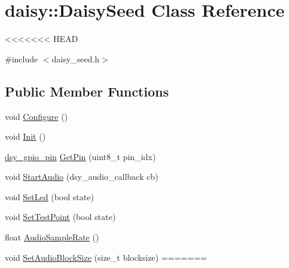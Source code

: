 \hypertarget{classdaisy_1_1_daisy_seed}{}\section{daisy\+:\+:Daisy\+Seed Class Reference}
\label{classdaisy_1_1_daisy_seed}
<<<<<<< HEAD


{\ttfamily \#include $<$daisy\+\_\+seed.\+h$>$}

\subsection*{Public Member Functions}
\begin{DoxyCompactItemize}
\item 
void \hyperlink{classdaisy_1_1_daisy_seed_a756338e5ffbd605a56930d1e634d30e6}{Configure} ()
\item 
void \hyperlink{classdaisy_1_1_daisy_seed_a7b122b78cb745b1e1bedfca9de8b2ad4}{Init} ()
\item 
\hyperlink{structdsy__gpio__pin}{dsy\+\_\+gpio\+\_\+pin} \hyperlink{classdaisy_1_1_daisy_seed_a0b123a4bc00a936e3d78ca2ab4aa2773}{Get\+Pin} (uint8\+\_\+t pin\+\_\+idx)
\item 
void \hyperlink{classdaisy_1_1_daisy_seed_a3a0b0dd45b4b87808f7d67912d4b7422}{Start\+Audio} (dsy\+\_\+audio\+\_\+callback cb)
\item 
void \hyperlink{classdaisy_1_1_daisy_seed_ac4501329b4a5a5cfb9e3cd6003fcda6f}{Set\+Led} (bool state)
\item 
void \hyperlink{classdaisy_1_1_daisy_seed_a213214b79bb612175f2e82241887d42e}{Set\+Test\+Point} (bool state)
\item 
float \hyperlink{classdaisy_1_1_daisy_seed_a4e95aadd1c473237e45c1882a140fc33}{Audio\+Sample\+Rate} ()
\item 
void \hyperlink{classdaisy_1_1_daisy_seed_a4209c18a3c181e8427ebc7639d4170b6}{Set\+Audio\+Block\+Size} (size\+\_\+t blocksize)
=======

\end{DoxyCompactItemize}
